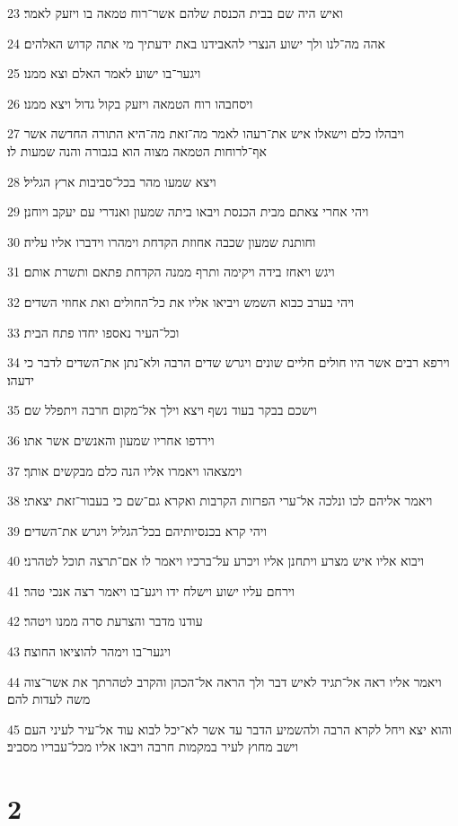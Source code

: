 \par 23 ואיש היה שם בבית הכנסת שלהם אשר־רוח טמאה בו ויזעק לאמר׃
\par 24 אהה מה־לנו ולך ישוע הנצרי להאבידנו באת ידעתיך מי אתה קדוש האלהים׃
\par 25 ויגער־בו ישוע לאמר האלם וצא ממנו׃
\par 26 ויסחבהו רוח הטמאה ויזעק בקול גדול ויצא ממנו׃
\par 27 ויבהלו כלם וישאלו איש את־רעהו לאמר מה־זאת מה־היא התורה החדשה אשר אף־לרוחות הטמאה מצוה הוא בגבורה והנה שמעות לו׃
\par 28 ויצא שמעו מהר בכל־סביבות ארץ הגליל׃
\par 29 ויהי אחרי צאתם מבית הכנסת ויבאו ביתה שמעון ואנדרי עם יעקב ויוחנן׃
\par 30 וחותנת שמעון שכבה אחוזת הקדחת וימהרו וידברו אליו עליה׃
\par 31 ויגש ויאחז בידה ויקימה ותרף ממנה הקדחת פתאם ותשרת אותם׃
\par 32 ויהי בערב כבוא השמש ויביאו אליו את כל־החולים ואת אחוזי השדים׃
\par 33 וכל־העיר נאספו יחדו פתח הבית׃
\par 34 וירפא רבים אשר היו חולים חליים שונים ויגרש שדים הרבה ולא־נתן את־השדים לדבר כי ידעהו׃
\par 35 וישכם בבקר בעוד נשף ויצא וילך אל־מקום חרבה ויתפלל שם׃
\par 36 וירדפו אחריו שמעון והאנשים אשר אתו׃
\par 37 וימצאהו ויאמרו אליו הנה כלם מבקשים אותך׃
\par 38 ויאמר אליהם לכו ונלכה אל־ערי הפרזות הקרבות ואקרא גם־שם כי בעבור־זאת יצאתי׃
\par 39 ויהי קרא בכנסיותיהם בכל־הגליל ויגרש את־השדים׃
\par 40 ויבוא אליו איש מצרע ויתחנן אליו ויכרע על־ברכיו ויאמר לו אם־תרצה תוכל לטהרני׃
\par 41 וירחם עליו ישוע וישלח ידו ויגע־בו ויאמר רצה אנכי טהר׃
\par 42 עודנו מדבר והצרעת סרה ממנו ויטהר׃
\par 43 ויגער־בו וימהר להוציאו החוצה׃
\par 44 ויאמר אליו ראה אל־תגיד לאיש דבר ולך הראה אל־הכהן והקרב לטהרתך את אשר־צוה משה לעדות להם׃
\par 45 והוא יצא ויחל לקרא הרבה ולהשמיע הדבר עד אשר לא־יכל לבוא עוד אל־עיר לעיני העם וישב מחוץ לעיר במקמות חרבה ויבאו אליו מכל־עבריו מסביב׃

\chapter{2}

